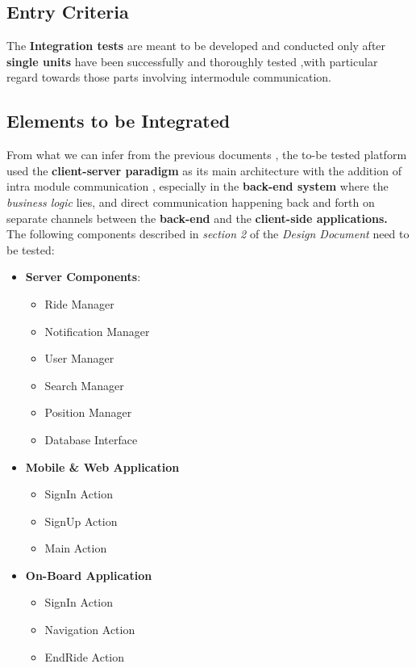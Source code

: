 \subsection{Entry Criteria}
The \textbf{Integration tests} are meant to be developed and conducted only after \textbf{single units} have been successfully and thoroughly tested ,with particular regard towards those parts involving intermodule communication.\\


\subsection{Elements to be Integrated}
From what we can infer from the previous documents , the to-be tested platform
used the \textbf{client-server paradigm} as its main architecture with the addition of intra module communication , especially in the \textbf{back-end system} where the \textit{business logic} lies, and direct communication happening back and forth on separate channels between the \textbf{back-end} and the \textbf{client-side applications.} \\
The following components described in \emph{section 2} of the \emph{Design Document} need to be tested:
\begin{itemize}
\item \textbf{Server Components}:
\begin{itemize}
\item Ride Manager
\item Notification Manager
\item User Manager
\item Search Manager
\item Position Manager
\item Database Interface
\end{itemize}
\item \textbf{Mobile \& Web Application}
\begin{itemize}
\item SignIn Action
\item SignUp Action
\item Main Action
\end{itemize}
\item \textbf{On-Board Application}
\begin{itemize}
\item SignIn Action
\item Navigation Action
\item EndRide Action
\end{itemize}
\end{itemize}

